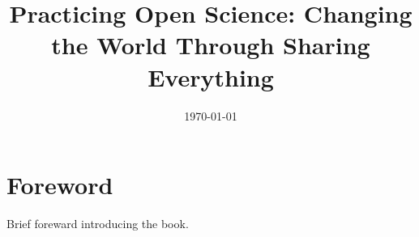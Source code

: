 \documentclass[letterpaper,10pt]{book}
\title{\textbf{Practicing Open Science:
Changing the World Through Sharing Everything}}
\date{\today}
\begin{document}
\maketitle

\newpage

\tableofcontents

\newpage

\section*{Foreword}

Brief foreward introducing the book.





\end{document}
